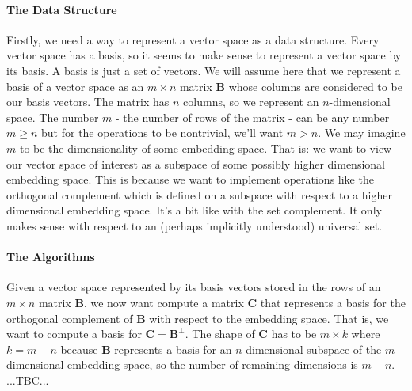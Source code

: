 \paragraph{The Data Structure}
Firstly, we need a way to represent a vector space as a data structure. Every vector space has a basis, so it seems to make sense to represent a vector space by its basis. A basis is just a set of vectors. We will assume here that we represent a basis of a vector space as an $m \times n$ matrix $\mathbf{B}$ whose columns are considered to be our basis vectors. The matrix has $n$ columns, so we represent an $n$-dimensional space. The number $m$ - the number of rows of the matrix - can be any number $m \geq n$ but for the operations to be nontrivial, we'll want $m > n$. We may imagine $m$ to be the dimensionality of some embedding space. That is: we want to view our vector space of interest as a subspace of some possibly higher dimensional embedding space. This is because we want to implement operations like the orthogonal complement which is defined on a subspace with respect to a higher dimensional embedding space. It's a bit like with the set complement. It only makes sense with respect to an (perhaps implicitly understood) universal set.


\paragraph{The Algorithms}
Given a vector space represented by its basis vectors stored in the rows of an $m \times n$ matrix $\mathbf{B}$, we now want compute a matrix $\mathbf{C}$ that represents a basis for the orthogonal complement of $\mathbf{B}$ with respect to the embedding space. That is, we want to compute a basis for $\mathbf{C} = \mathbf{B}^\perp$. The shape of $\mathbf{C}$ has to be $m \times k$ where $k = m - n$ because $\mathbf{B}$ represents a basis for an $n$-dimensional subspace of the $m$-dimensional embedding space, so the number of remaining dimensions is $m-n$. ...TBC...


